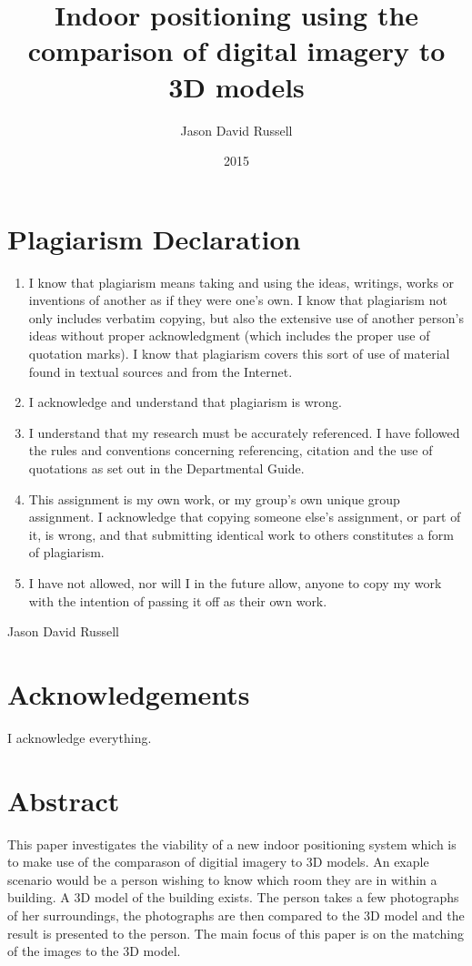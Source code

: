 \documentclass[11pt,a4paper]{article}
\title{Indoor positioning using the comparison of digital imagery to 3D models}
\date{2015}
\author{Jason David Russell}
\begin{document}
\maketitle
\thispagestyle{empty}

\setcounter{page}{0}

\newpage
\section*{Plagiarism Declaration}
	\begin{enumerate}
		\item
			I know that plagiarism means taking and using the ideas, writings, works or inventions of another as if they were one's own. I know that plagiarism not only includes verbatim copying, but also the extensive use of another person's ideas without proper acknowledgment (which includes the proper use of quotation marks). I know that plagiarism covers this sort of use of material found in textual sources and from the Internet.
		\item
			I acknowledge and understand that plagiarism is wrong.
		\item
			I understand that my research must be accurately referenced. I have followed the rules and conventions concerning referencing, citation and the use of quotations as set out in the Departmental Guide.
		\item
			This assignment is my own work, or my group's own unique group assignment.
			I acknowledge that copying someone else's assignment, or part of it, is wrong, and that submitting identical work to others constitutes a form of plagiarism.
		\item
			I have not allowed, nor will I in the future allow, anyone to copy my work with the intention of passing it off as their own work.
	\end{enumerate}
	Jason David Russell

\newpage
\section*{Acknowledgements}
	I acknowledge everything.

\newpage
\section*{Abstract}
	This paper investigates the viability of a new indoor positioning system which is to make use of the comparason of digitial imagery to 3D models. An exaple scenario would be a person wishing to know which room they are in within a building. A 3D model of the building exists. The person takes a few photographs of her surroundings, the photographs are then compared to the 3D model and the result is presented to the person. The main focus of this paper is on the matching of the images to the 3D model.
\end{document}
